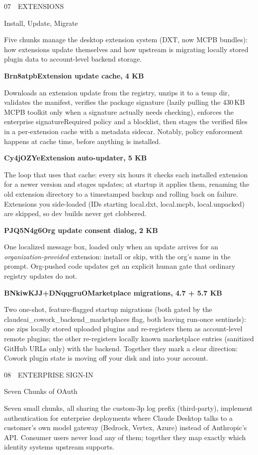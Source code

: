 \documentclass[11pt]{article}
\newcommand{\mono}{\ttfamily}
\newcommand{\reppar}[1]{{\fontsize{10.5}{15.2}\selectfont #1\par}\vspace{8pt}}
\newcommand{\code}[1]{{\mono\small #1}}
\newcommand{\reportsection}[3]{%
  \vspace{14pt}%
  {\mono\footnotesize\color{baseMid}\addfontfeatures{LetterSpace=8.0}\MakeUppercase{#1\, \textbullet\, #2}}\par
  \vspace{3pt}%
  {\heavy\fontsize{17}{19}\selectfont\color{base900} #3\par}
  \vspace{4pt}{\color{accent}\hrule height 1.6pt}\vspace{9pt}%
}
\newcommand{\chunkhead}[2]{%
  \vspace{4pt}%
  {\fontsize{10.5}{15.2}\selectfont
   {\mono\bfseries\color{accentink}#1}\;\textbullet\;\textbf{#2}\par}
  \vspace{2pt}}
\begin{document}
\reportsection{07}{Extensions}{Install, Update, Migrate}

\reppar{Five chunks manage the desktop extension system (DXT, now MCPB bundles): how extensions update themselves and how upstream is migrating locally stored plugin data to account-level backend storage.}

\chunkhead{Brn8atpb}{Extension update cache, 4 KB}
\reppar{Downloads an extension update from the registry, unzips it to a temp dir, validates the manifest, verifies the package signature (lazily pulling the 430\,KB MCPB toolkit only when a signature actually needs checking), enforces the enterprise \code{signatureRequired} policy and a blocklist, then stages the verified files in a per-extension cache with a metadata sidecar. Notably, policy enforcement happens at cache time, before anything is installed.}

\chunkhead{Cy4jOZYe}{Extension auto-updater, 5 KB}
\reppar{The loop that uses that cache: every six hours it checks each installed extension for a newer version and stages updates; at startup it applies them, renaming the old extension directory to a timestamped backup and rolling back on failure. Extensions you side-loaded (IDs starting \code{local.dxt}, \code{local.mcpb}, \code{local.unpacked}) are skipped, so dev builds never get clobbered.}

\chunkhead{PJQ5N4g6}{Org update consent dialog, 2 KB}
\reppar{One localized message box, loaded only when an update arrives for an \textit{organization-provided} extension: install or skip, with the org's name in the prompt. Org-pushed code updates get an explicit human gate that ordinary registry updates do not.}

\chunkhead{BNkiwKJJ\;+\;DNqqgruO}{Marketplace migrations, 4.7 + 5.7 KB}
\reppar{Two one-shot, feature-flagged startup migrations (both gated by the \code{claudeai\_cowork\_backend\_marketplaces} flag, both leaving run-once sentinels): one zips locally stored uploaded plugins and re-registers them as account-level remote plugins; the other re-registers locally known marketplace entries (sanitized GitHub URLs only) with the backend. Together they mark a clear direction: Cowork plugin state is moving off your disk and into your account.}

\reportsection{08}{Enterprise Sign-In}{Seven Chunks of OAuth}

\reppar{Seven small chunks, all sharing the \code{custom-3p} log prefix (third-party), implement authentication for enterprise deployments where Claude Desktop talks to a customer's own model gateway (Bedrock, Vertex, Azure) instead of Anthropic's API. Consumer users never load any of them; together they map exactly which identity systems upstream supports.}
\end{document}
